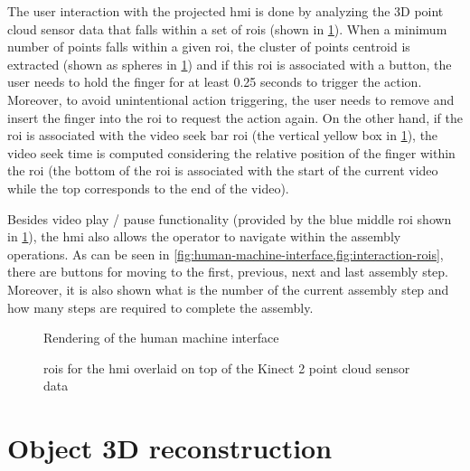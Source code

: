 The user interaction with the projected \gls{hmi} is done by analyzing the 3D point cloud sensor data that falls within a set of \glspl{roi} (shown in \cref{fig:interaction-rois}). When a minimum number of points falls within a given \gls{roi}, the cluster of points centroid is extracted (shown as spheres in \cref{fig:interaction-rois}) and if this \gls{roi} is associated with a button, the user needs to hold the finger for at least 0.25 seconds to trigger the action. Moreover, to avoid unintentional action triggering, the user needs to remove and insert the finger into the \gls{roi} to request the action again. On the other hand, if the \gls{roi} is associated with the video seek bar \gls{roi} (the vertical yellow box in \cref{fig:interaction-rois}), the video seek time is computed considering the relative position of the finger within the \gls{roi} (the bottom of the \gls{roi} is associated with the start of the current video while the top corresponds to the end of the video).

Besides video play / pause functionality (provided by the blue middle \gls{roi} shown in \cref{fig:interaction-rois}), the \gls{hmi} also allows the operator to navigate within the assembly operations. As can be seen in \cref{fig:human-machine-interface,fig:interaction-rois}, there are buttons for moving to the first, previous, next and last assembly step. Moreover, it is also shown what is the number of the current assembly step and how many steps are required to complete the assembly.

\begin{figure}[H]
	\begin{floatrow}[2]
		{\caption{Rendering of the human machine interface}\label{fig:human-machine-interface}}
		{\caption{\glspl{roi} for the \gls{hmi} overlaid on top of the Kinect 2 point cloud sensor data}\label{fig:interaction-rois}}
	\end{floatrow}
\end{figure}


\section{Object 3D reconstruction}

